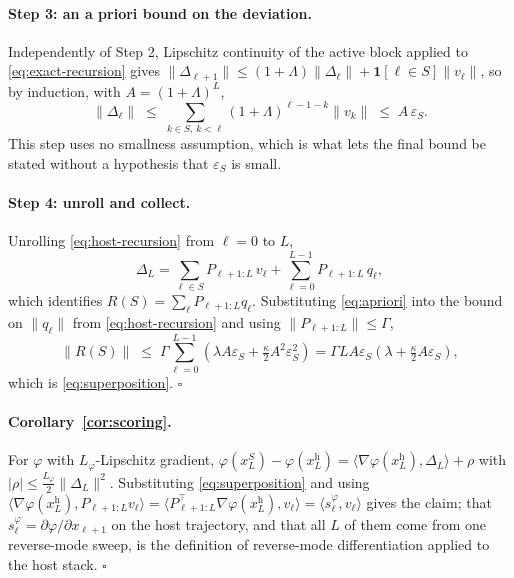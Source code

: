 \documentclass[10pt]{article}
\theoremstyle{plain}
\theoremstyle{definition}
\theoremstyle{remark}
\newcommand{\host}{\mathrm{h}}
\begin{document}
\paragraph{Step 3: an a priori bound on the deviation.}
Independently of Step 2, Lipschitz continuity of the active block applied to
\eqref{eq:exact-recursion} gives
$\|\Delta_{\ell+1}\| \le (1+\Lambda)\|\Delta_\ell\| + \mathbf{1}[\ell\in S]\|v_\ell\|$,
so by induction, with $A=(1+\Lambda)^L$,
\begin{equation}
\label{eq:apriori}
\|\Delta_\ell\| \;\le\; \sum_{k\in S,\, k<\ell} (1+\Lambda)^{\ell-1-k}\|v_k\| \;\le\; A\,\varepsilon_S .
\end{equation}
This step uses no smallness assumption, which is what lets the final bound be
stated without a hypothesis that $\varepsilon_S$ is small.

\paragraph{Step 4: unroll and collect.}
Unrolling \eqref{eq:host-recursion} from $\ell=0$ to $L$,
\begin{equation}
\Delta_L = \sum_{\ell\in S} P_{\ell+1:L}\, v_\ell + \sum_{\ell=0}^{L-1} P_{\ell+1:L}\, q_\ell ,
\end{equation}
which identifies $R(S) = \sum_\ell P_{\ell+1:L} q_\ell$. Substituting
\eqref{eq:apriori} into the bound on $\|q_\ell\|$ from \eqref{eq:host-recursion}
and using $\|P_{\ell+1:L}\|\le\Gamma$,
\begin{equation}
\|R(S)\| \;\le\; \Gamma\sum_{\ell=0}^{L-1}\left(\lambda A\varepsilon_S + \tfrac{\kappa}{2}A^2\varepsilon_S^2\right)
= \Gamma L A \varepsilon_S\left(\lambda + \tfrac{\kappa}{2}A\varepsilon_S\right),
\end{equation}
which is \eqref{eq:superposition}. \hfill$\square$

\paragraph{Corollary~\ref{cor:scoring}.}
For $\varphi$ with $L_\varphi$-Lipschitz gradient,
$\varphi(x^{S}_L)-\varphi(x^{\host}_L) = \langle\nabla\varphi(x^{\host}_L),\Delta_L\rangle + \rho$
with $|\rho|\le \tfrac{L_\varphi}{2}\|\Delta_L\|^2$. Substituting
\eqref{eq:superposition} and using
$\langle\nabla\varphi(x^{\host}_L), P_{\ell+1:L} v_\ell\rangle = \langle P_{\ell+1:L}^{\top}\nabla\varphi(x^{\host}_L), v_\ell\rangle = \langle s^{\varphi}_\ell, v_\ell\rangle$
gives the claim; that $s^{\varphi}_\ell = \partial\varphi/\partial x_{\ell+1}$ on
the host trajectory, and that all $L$ of them come from one reverse-mode sweep,
is the definition of reverse-mode differentiation applied to the host stack.
\hfill$\square$
\end{document}
